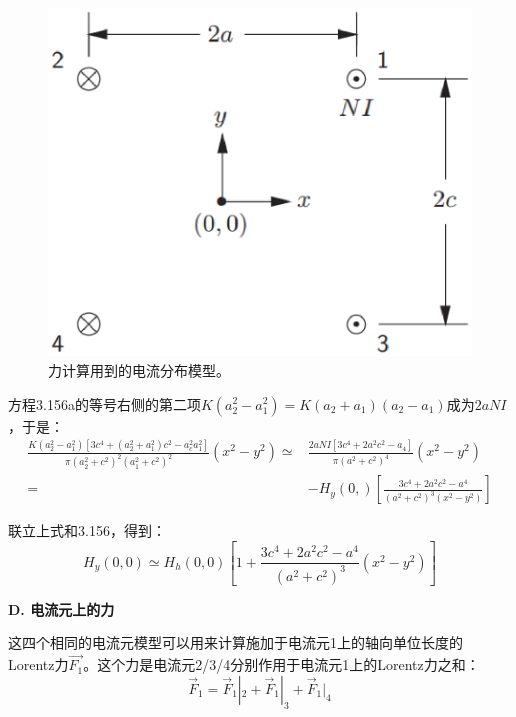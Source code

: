 \begin{figure}[htbp]
	\centering
	\includegraphics[scale=0.5]{chpt3/figs/fig3.38.eps}
	\caption{力计算用到的电流分布模型。}
\end{figure}

方程3.156a的等号右侧的第二项$K(a_2^2−a^2_1)=K(a_2+a_1)(a_2−a_1)$成为$2aNI$，于是：
\begin{equation*}
\begin{split}
\frac{K(a_{2}^{2}-a_{1}^{2})[3c^{4}+(a_{2}^{2}+a_{1}^{2})c^{2}-a_{c}^{2}a_{1}^{2}]}{\pi(a_{2}^{2}+c^{2})^{2}(a_{1}^{2}+c^{2})^{2}}(x^{2}-y^{2})\simeq&\frac{2aNI[3c^{4}+2a^{2}c^{2}-a_{4}]}{\pi(a^{2}+c^{2})^{4}}(x^{2}-y^{2})\\
=&-H_{y}(0,)\left[\frac{3c^{4}+2a^{2}c^{2}-a^{4}}{(a^{2}+c^{2})^{3}(x^{2}-y^{2})}\right]
\end{split}
\end{equation*}

联立上式和3.156，得到：
\begin{equation*}
H_{y}(0,0)\simeq H_{h}(0,0)\left[1+\frac{3c^{4}+2a^{2}c^{2}-a^{4}}{(a^{2}+c^{2})^{3}}(x^{2}-y^{2})\right]\tag{3.157b}%
\end{equation*}

\textbf{D. 电流元上的力}

这四个相同的电流元模型可以用来计算施加于电流元1上的轴向单位长度的
Lorentz力$\vec{F_1}$。这个力是电流元2/3/4分别作用于电流元1上的Lorentz力之和：
\begin{equation}
\vec{F}_{1}=\vec{F}_{1}|_{2}+\vec{F}_{1}|_{3}+\vec{F}_{1}|_{4}%
\end{equation}

